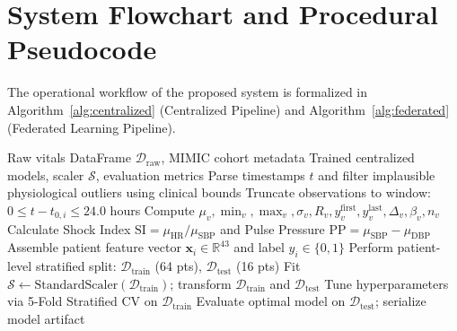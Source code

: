 \section{System Flowchart and Procedural Pseudocode}
\label{sec:flowchart_pseudocode}

The operational workflow of the proposed system is formalized in Algorithm~\ref{alg:centralized} (Centralized Pipeline) and Algorithm~\ref{alg:federated} (Federated Learning Pipeline).

\begin{algorithm}[htbp]
\caption{Centralized Preprocessing and Benchmark Pipeline}
\label{alg:centralized}
\begin{algorithmic}[1]
\REQUIRE Raw vitals DataFrame $\mathcal{D}_{\text{raw}}$, MIMIC cohort metadata
\ENSURE Trained centralized models, scaler $\mathcal{S}$, evaluation metrics
\STATE Parse timestamps $t$ and filter implausible physiological outliers using clinical bounds
\STATE Truncate observations to window: $0 \le t - t_{0, i} \le 24.0$ hours
        \STATE Compute $\mu_v, \min_v, \max_v, \sigma_v, R_v, y_v^{\text{first}}, y_v^{\text{last}}, \Delta_v, \beta_v, n_v$
    \ENDFOR
    \STATE Calculate Shock Index $\text{SI} = \mu_{\text{HR}}/\mu_{\text{SBP}}$ and Pulse Pressure $\text{PP} = \mu_{\text{SBP}} - \mu_{\text{DBP}}$
    \STATE Assemble patient feature vector $\mathbf{x}_i \in \mathbb{R}^{43}$ and label $y_i \in \{0, 1\}$
\ENDFOR
\STATE Perform patient-level stratified split: $\mathcal{D}_{\text{train}}$ (64 pts), $\mathcal{D}_{\text{test}}$ (16 pts)
\STATE Fit $\mathcal{S} \leftarrow \text{StandardScaler}(\mathcal{D}_{\text{train}})$; transform $\mathcal{D}_{\text{train}}$ and $\mathcal{D}_{\text{test}}$
    \STATE Tune hyperparameters via 5-Fold Stratified CV on $\mathcal{D}_{\text{train}}$
    \STATE Evaluate optimal model on $\mathcal{D}_{\text{test}}$; serialize model artifact
\ENDFOR
\end{algorithmic}
\end{algorithm}

